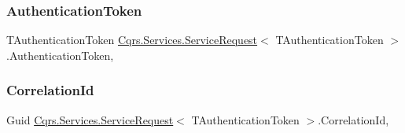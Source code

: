 \subsubsection{\texorpdfstring{Authentication\+Token}{AuthenticationToken}}
{\footnotesize\ttfamily T\+Authentication\+Token \hyperlink{classCqrs_1_1Services_1_1ServiceRequest}{Cqrs.\+Services.\+Service\+Request}$<$ T\+Authentication\+Token $>$.Authentication\+Token\hspace{0.3cm}{\ttfamily [get]}, {\ttfamily [set]}}

\mbox{\label{classCqrs_1_1Services_1_1ServiceRequest_abbf7a905744ac65ab59edf4f550cad61_abbf7a905744ac65ab59edf4f550cad61}} 
\subsubsection{\texorpdfstring{Correlation\+Id}{CorrelationId}}
{\footnotesize\ttfamily Guid \hyperlink{classCqrs_1_1Services_1_1ServiceRequest}{Cqrs.\+Services.\+Service\+Request}$<$ T\+Authentication\+Token $>$.Correlation\+Id\hspace{0.3cm}{\ttfamily [get]}, {\ttfamily [set]}}

